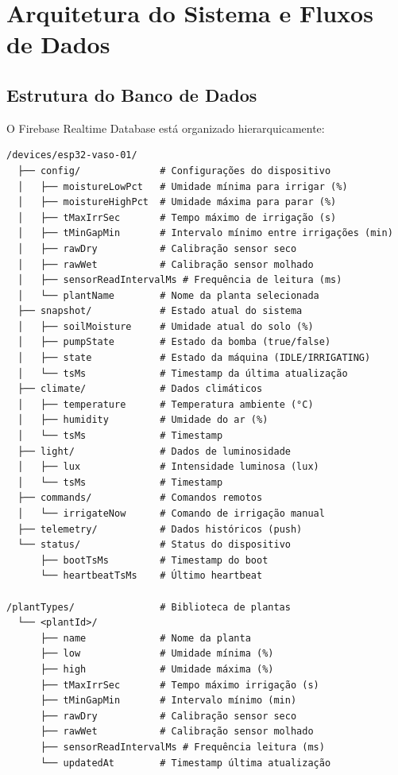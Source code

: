 \documentclass[twoside,english,brazilian]{UNISINOSmonografia}
\begin{document}
\section{Arquitetura do Sistema e Fluxos de Dados}

\subsection{Estrutura do Banco de Dados}
O Firebase Realtime Database está organizado hierarquicamente:

\begin{verbatim}
/devices/esp32-vaso-01/
  ├── config/              # Configurações do dispositivo
  │   ├── moistureLowPct   # Umidade mínima para irrigar (%)
  │   ├── moistureHighPct  # Umidade máxima para parar (%)
  │   ├── tMaxIrrSec       # Tempo máximo de irrigação (s)
  │   ├── tMinGapMin       # Intervalo mínimo entre irrigações (min)
  │   ├── rawDry           # Calibração sensor seco
  │   ├── rawWet           # Calibração sensor molhado
  │   ├── sensorReadIntervalMs # Frequência de leitura (ms)
  │   └── plantName        # Nome da planta selecionada
  ├── snapshot/            # Estado atual do sistema
  │   ├── soilMoisture     # Umidade atual do solo (%)
  │   ├── pumpState        # Estado da bomba (true/false)
  │   ├── state            # Estado da máquina (IDLE/IRRIGATING)
  │   └── tsMs             # Timestamp da última atualização
  ├── climate/             # Dados climáticos
  │   ├── temperature      # Temperatura ambiente (°C)
  │   ├── humidity         # Umidade do ar (%)
  │   └── tsMs             # Timestamp
  ├── light/               # Dados de luminosidade
  │   ├── lux              # Intensidade luminosa (lux)
  │   └── tsMs             # Timestamp
  ├── commands/            # Comandos remotos
  │   └── irrigateNow      # Comando de irrigação manual
  ├── telemetry/           # Dados históricos (push)
  └── status/              # Status do dispositivo
      ├── bootTsMs         # Timestamp do boot
      └── heartbeatTsMs    # Último heartbeat

/plantTypes/               # Biblioteca de plantas
  └── <plantId>/
      ├── name             # Nome da planta
      ├── low              # Umidade mínima (%)
      ├── high             # Umidade máxima (%)
      ├── tMaxIrrSec       # Tempo máximo irrigação (s)
      ├── tMinGapMin       # Intervalo mínimo (min)
      ├── rawDry           # Calibração sensor seco
      ├── rawWet           # Calibração sensor molhado
      ├── sensorReadIntervalMs # Frequência leitura (ms)
      └── updatedAt        # Timestamp última atualização
\end{verbatim}
\end{document}
